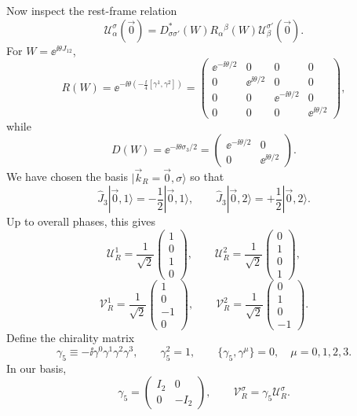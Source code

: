 Now inspect the rest-frame relation
\[
  \mathcal U_\alpha^\sigma(\vec0)
  =
  D_{\sigma\sigma'}^*(W)R_\alpha{}^\beta(W)
  \mathcal U_\beta^{\sigma'}(\vec0).
\]
For \(W=\ee^{\ii\theta J_{12}}\),
\[
  R(W)
  =
  \ee^{-\ii\theta\left(-\frac{\ii}{4}[\gamma^1,\gamma^2]\right)}
  =
  \begin{pmatrix}
  \ee^{-\ii\theta/2}&0&0&0\\
  0&\ee^{\ii\theta/2}&0&0\\
  0&0&\ee^{-\ii\theta/2}&0\\
  0&0&0&\ee^{\ii\theta/2}
  \end{pmatrix},
\]
while
\[
  D(W)=\ee^{-\ii\theta\sigma_3/2}
  =
  \begin{pmatrix}
  \ee^{-\ii\theta/2}&0\\
  0&\ee^{\ii\theta/2}
  \end{pmatrix}.
\]
We have chosen the basis \(|\vec k_R=\vec0,\sigma\rangle\) so that
\[
  \widehat J_3|\vec0,1\rangle
  =
  -\frac12|\vec0,1\rangle,
  \qquad
  \widehat J_3|\vec0,2\rangle
  =
  +\frac12|\vec0,2\rangle.
\]
Up to overall phases, this gives
\[
  \mathcal U_R^1=\frac1{\sqrt2}
  \begin{pmatrix}1\\0\\1\\0\end{pmatrix},
  \qquad
  \mathcal U_R^2=\frac1{\sqrt2}
  \begin{pmatrix}0\\1\\0\\1\end{pmatrix},
\]
\[
  \mathcal V_R^1=\frac1{\sqrt2}
  \begin{pmatrix}1\\0\\-1\\0\end{pmatrix},
  \qquad
  \mathcal V_R^2=\frac1{\sqrt2}
  \begin{pmatrix}0\\1\\0\\-1\end{pmatrix}.
\]
Define the chirality matrix
\[
  \gamma_5\equiv -\ii\gamma^0\gamma^1\gamma^2\gamma^3,
  \qquad
  \gamma_5^2=1,
  \qquad
  \{\gamma_5,\gamma^\mu\}=0,
  \quad \mu=0,1,2,3.
\]
In our basis,
\[
  \gamma_5=
  \begin{pmatrix}
  I_2&0\\ 0&-I_2
  \end{pmatrix},
  \qquad
  \mathcal V_R^\sigma=\gamma_5\mathcal U_R^\sigma.
\]

